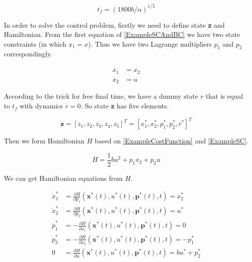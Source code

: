 ﻿\documentclass[twoside]{article}
\begin{document}
\begin{equation}\label{ExampleAnalyticalSolution}
t_f = (1800b/\alpha)^{1/5}
\end{equation}

In order to solve the control problem, firstly we need to define state \textbf{z} and Hamiltonian. From the first equation of \eqref{ExampleSCAndBC} we have two state constraints (in which $x_1 = x$). Thus we have two Lagrange multipliers $p_1$ and $p_2$ correspondingly.

\begin{equation}\label{ExampleSC}%
\begin{split}
\dot{x_1} &= x_2 \\
\dot{x_2} &= u
\end{split}
\end{equation}

According to the trick for free final time, we have a dummy state $r$ that is equal to $t_f$ with dynamics $\dot{r} = 0$. So state \textbf{z} has five elements.

\begin{equation}\label{ExampleState}
\textbf{z} = [z_1, z_2, z_3, z_4, z_5] ^T= [x_1^*, x_2^*, p_1^*, p_2^*, r^*]^T
\end{equation}

Then we form Hamiltonian $H$ based on \eqref{ExampleCostFunction} and \eqref{ExampleSC}.

\begin{equation}\label{ExampleH}
H = \frac{1}{2}bu^2 + p_1x_2 + p_2u
\end{equation}

We can get Hamiltonian equations from $H$.

\begin{equation}\label{ExampleHEqs}
\begin{split}
\dot{x}_1^* &= \frac{\partial{H}}{\partial{p_1}}(\textbf{x}^*(t),u^*(t),\textbf{p}^*(t),t)= x_2^* \\
\dot{x}_2^* &= \frac{\partial{H}}{\partial{p_2}}(\textbf{x}^*(t),u^*(t),\textbf{p}^*(t),t)= u^* \\
\dot{p}_1^* &= -\frac{\partial{H}}{\partial{x_1}}(\textbf{x}^*(t),u^*(t),\textbf{p}^*(t),t)= 0 \\
\dot{p}_2^* &= -\frac{\partial{H}}{\partial{x_2}}(\textbf{x}^*(t),u^*(t),\textbf{p}^*(t),t)=-p_1^* \\
0 &= \frac{\partial{H}}{\partial{u}}(\textbf{x}^*(t),u^*(t),\textbf{p}^*(t),t) = bu^* + p_2^*
\end{split}
\end{equation}
\end{document}
